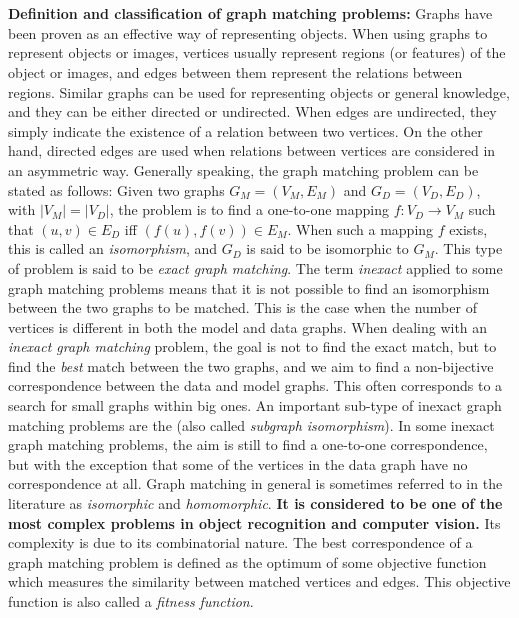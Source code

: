 \documentclass[]{article}
\begin{document}
		\\ \\
		\textbf{Definition and classification of graph matching problems:}  Graphs have been proven as an effective way of representing objects.  When using graphs to represent objects or images, vertices usually represent regions (or features) of the object or images, and edges between them represent the relations between regions.  Similar graphs can be used for representing objects or general knowledge, and they can be either directed or undirected.  When edges are undirected, they simply indicate the existence of a relation between two vertices.  On the other hand, directed edges are used when relations between vertices are considered in an asymmetric way.  Generally speaking, the graph matching problem can be stated as follows:  Given two graphs $G_{M}=(V_{M}, E_{M})$ and $G_{D}=(V_{D}, E_{D})$, with $|V_{M}| = |V_{D}|$, the problem is to find a one-to-one mapping $f:V_{D} \rightarrow V_{M}$ such that $(u,v)\in E_{D}$ iff $(f(u),f(v))\in E_{M}$.  When such a mapping $f$ exists, this is called an \textit{isomorphism}, and $G_{D}$ is said to be isomorphic to $G_{M}$.  This type of problem is said to be \textit{exact graph matching}.  The term \textit{inexact} applied to some graph matching problems means that it is not possible to find an isomorphism between the two graphs to be matched.  This is the case when the number of vertices is different in both the model and  data graphs.  When dealing with an \textit{inexact graph matching} problem, the goal is not to find the exact match, but to find the \textit{best} match between the two graphs, and we aim to find a non-bijective correspondence between the data and model graphs. This often corresponds to a search for small graphs within big ones.  An important sub-type of inexact graph matching problems are the  (also called \textit{subgraph isomorphism}).  In some inexact graph matching problems, the aim is still to find a one-to-one correspondence, but with the exception that some of the vertices in the data graph have no correspondence at all.  Graph matching in general is sometimes referred to in the literature as \textit{isomorphic} and \textit{homomorphic}.  \textbf{It is considered to be one of the most complex problems in object recognition and computer vision.}  Its complexity is due to its combinatorial nature. The best correspondence of a graph matching problem is defined as the optimum of some objective function which measures the similarity between matched vertices and edges.  This objective function is also called a \textit{fitness function}.		
\end{document}
